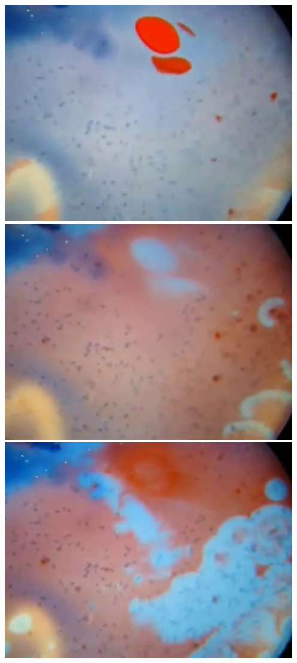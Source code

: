 \documentclass[12pt]{report}
\begin{document}
{\includegraphics[scale=0.25]{BZ-frames0015.png}
\includegraphics[scale=0.25]{BZ-frames0016.png}
\includegraphics[scale=0.25]{BZ-frames0017.png}
}
\end{document}
